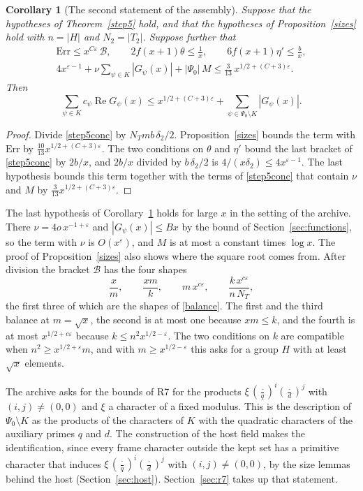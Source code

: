 \documentclass[11pt,letterpaper]{article}
\newtheorem{corollary}[theorem]{Corollary}
\numberwithin{equation}{section}
\begin{document}
\begin{corollary}[The second statement of the assembly]\label{asm}
Suppose that the hypotheses of Theorem~\ref{step5} hold, and that the hypotheses of Proposition~\ref{sizes} hold with $n=|H|$ and $N_2=|T_2|$. Suppose further that
\begin{gather*}
\mathrm{Err}\le x^{C\varepsilon}\,\mathcal B,\qquad2f(x+1)\theta\le\frac1x,\qquad6f(x+1)\eta'\le\frac bx,\\
4x^{\varepsilon-1}+\nu\sum_{\psi\in K}|G_\psi(x)|+|\Psi_0|\,M\le\frac3{13}\,x^{1/2+(C+3)\varepsilon}.
\end{gather*}
Then
\[
\sum_{\psi\in K}c_\psi\operatorname{Re}G_\psi(x)\le x^{1/2+(C+3)\varepsilon}+\sum_{\psi\in\Psi_0\setminus K}|G_\psi(x)| .
\]
\end{corollary}
\begin{proof}
Divide \eqref{step5conc} by $N_Tmb\,\delta_2/2$. Proposition~\ref{sizes} bounds the term with $\mathrm{Err}$ by $\tfrac{10}{13}x^{1/2+(C+3)\varepsilon}$. The two conditions on $\theta$ and $\eta'$ bound the last bracket of \eqref{step5conc} by $2b/x$, and $2b/x$ divided by $b\,\delta_2/2$ is $4/(x\delta_2)\le4x^{\varepsilon-1}$. The last hypothesis bounds this term together with the terms of \eqref{step5conc} that contain $\nu$ and $M$ by $\tfrac3{13}x^{1/2+(C+3)\varepsilon}$.
\end{proof}

The last hypothesis of Corollary~\ref{asm} holds for large $x$ in the setting of the archive. There $\nu=4o\,x^{-1+\varepsilon}$ and $|G_\psi(x)|\le Bx$ by the bound of Section~\ref{sec:functions}, so the term with $\nu$ is $O(x^{\varepsilon})$, and $M$ is at most a constant times $\log x$. The proof of Proposition~\ref{sizes} also shows where the square root comes from. After division the bracket $\mathcal B$ has the four shapes
\[
\frac xm,\qquad\frac{xm}k,\qquad m\,x^{c\varepsilon},\qquad\frac{k\,x^{c\varepsilon}}{n\,N_T},
\]
the first three of which are the shapes of \eqref{balance}. The first and the third balance at $m=\sqrt x$, the second is at most one because $xm\le k$, and the fourth is at most $x^{1/2+c\varepsilon}$ because $k\le n^2x^{1/2-\varepsilon}$. The two conditions on $k$ are compatible when $n^2\ge x^{1/2+\varepsilon}m$, and with $m\ge x^{1/2-\varepsilon}$ this asks for a group $H$ with at least $\sqrt x$ elements.

The archive asks for the bounds of R7 for the products $\xi\,(\tfrac{\cdot}{q})^i(\tfrac{\cdot}{d})^j$ with $(i,j)\ne(0,0)$ and $\xi$ a character of a fixed modulus. This is the description of $\Psi_0\setminus K$ as the products of the characters of $K$ with the quadratic characters of the auxiliary primes $q$ and $d$. The construction of the host field makes the identification, since every frame character outside the kept set has a primitive character that induces $\xi\,(\tfrac{\cdot}{q})^i(\tfrac{\cdot}{d})^j$ with $(i,j)\ne(0,0)$, by the size lemmas behind the host (Section~\ref{sec:host}). Section~\ref{sec:r7} takes up that statement.
\end{document}
